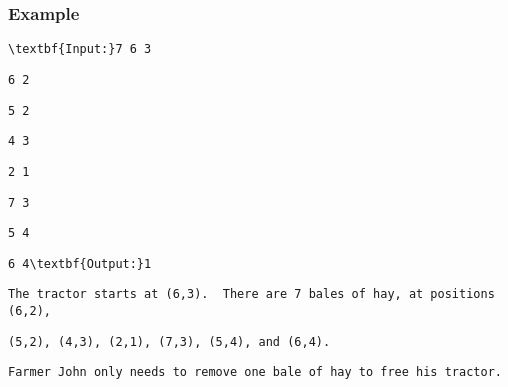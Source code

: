 \subsubsection{Example}
\begin{verbatim}
\textbf{Input:}7 6 3 \end{verbatim}
\begin{verbatim}
6 2 \end{verbatim}
\begin{verbatim}
5 2 \end{verbatim}
\begin{verbatim}
4 3 \end{verbatim}
\begin{verbatim}
2 1 \end{verbatim}
\begin{verbatim}
7 3 \end{verbatim}
\begin{verbatim}
5 4 \end{verbatim}
\begin{verbatim}
6 4\textbf{Output:}1\end{verbatim}
\begin{verbatim}
The tractor starts at (6,3).  There are 7 bales of hay, at positions (6,2), \end{verbatim}
\begin{verbatim}
(5,2), (4,3), (2,1), (7,3), (5,4), and (6,4).\end{verbatim}
\begin{verbatim}
Farmer John only needs to remove one bale of hay to free his tractor.\end{verbatim}